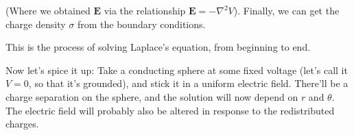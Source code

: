 \documentclass{article}
\begin{document}
(Where we obtained $\bm{E}$ via the relationship $\bm{E} = -\nabla^2 V$). Finally, we can get the charge density $\sigma$ from the boundary conditions.

\vspace{1em}

This is the process of solving Laplace's equation, from beginning to end.

\vspace{1em}

Now let's spice it up: Take a conducting sphere at some fixed voltage (let's call it $V=0$, so that it's grounded), and stick it in a uniform electric field. There'll be a charge separation on the sphere, and the solution will now depend on $r$ and $\theta$. The electric field will probably also be altered in response to the redistributed charges.
\end{document}

